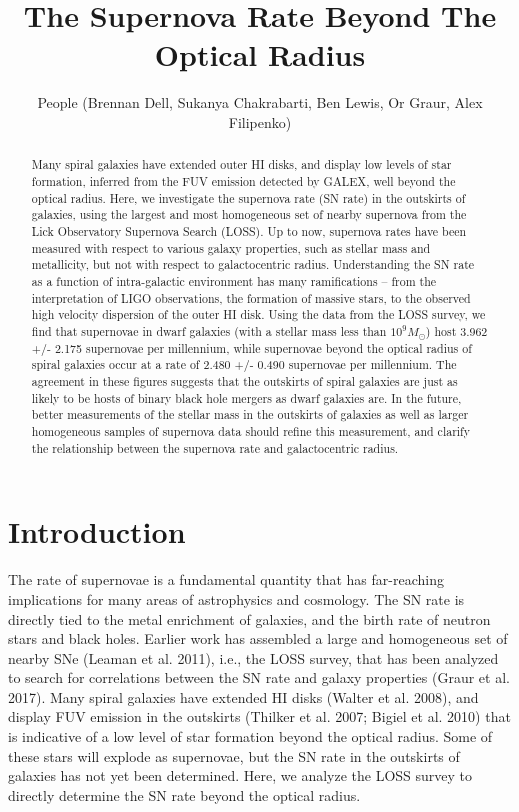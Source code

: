 \documentclass[apj]{emulateapj}
\begin{document}
\title{The Supernova Rate Beyond The Optical Radius}

\author{People (Brennan Dell, Sukanya Chakrabarti, Ben Lewis, Or Graur, Alex Filipenko)}

\begin{abstract}
Many spiral galaxies have extended outer HI disks, and display low levels of star formation, inferred from the FUV emission detected by GALEX, well beyond the optical radius. Here, we investigate the supernova rate (SN rate) in the outskirts of galaxies, using the largest and most homogeneous set of nearby supernova from the Lick Observatory Supernova Search (LOSS).    Up to now, supernova rates have been measured with respect to various galaxy properties, such as stellar mass and metallicity, but not with respect to galactocentric radius.  Understanding the SN rate as a function of intra-galactic environment has many ramifications -- from the interpretation of LIGO observations, the formation of massive stars, to the observed high velocity dispersion of the outer HI disk.  Using the data from the LOSS survey, we find that supernovae in dwarf galaxies (with a stellar mass less than $10^{9} M_{\odot}$) host 3.962 +/- 2.175 supernovae per millennium, while supernovae beyond the optical radius of spiral galaxies occur at a rate of 2.480 +/- 0.490 supernovae per millennium. The agreement in these figures suggests that the outskirts of spiral galaxies are just as likely to be hosts of binary black hole mergers as dwarf galaxies are. In the future, better measurements of the stellar mass in the outskirts of galaxies as well as larger homogeneous samples of supernova data should refine this measurement, and clarify the relationship between the supernova rate and galactocentric radius.
\end{abstract}

\section{Introduction}

The rate of supernovae is a fundamental quantity that has far-reaching implications for many areas of astrophysics and cosmology.  The SN rate is directly tied to the metal enrichment of galaxies, and the birth rate of neutron stars and black holes.  Earlier work has assembled a large and homogeneous set of nearby SNe (Leaman et al. 2011), i.e., the LOSS survey, that has been analyzed to search for correlations between the SN rate and galaxy properties (Graur et al. 2017).  Many spiral galaxies have extended HI disks (Walter et al. 2008), and display FUV emission in the outskirts (Thilker et al. 2007; Bigiel et al. 2010) that is indicative of a low level of star formation beyond the optical radius. Some of these stars will explode as supernovae, but the SN rate in the outskirts of galaxies has not yet been determined.  Here, we analyze the LOSS survey to directly determine the SN rate beyond the optical radius.
\end{document}
